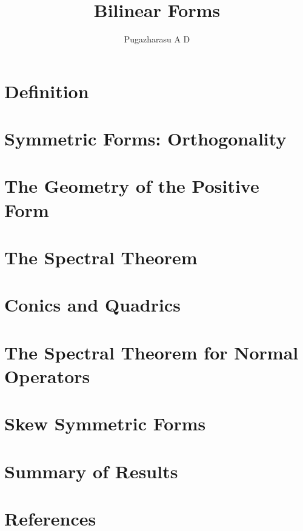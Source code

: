 \documentclass[]{article}
\title{Bilinear Forms}
\author{Pugazharasu A D}
\begin{document}
\maketitle

\begin{abstract}

\end{abstract}
\section{Definition}
\section{Symmetric Forms: Orthogonality}
\section{The Geometry of the Positive Form}
\section{The Spectral Theorem}
\section{Conics and Quadrics}
\section{The Spectral Theorem for Normal Operators}
\section{Skew Symmetric Forms}
\section{Summary of Results}
\section*{References}
\end{document}
